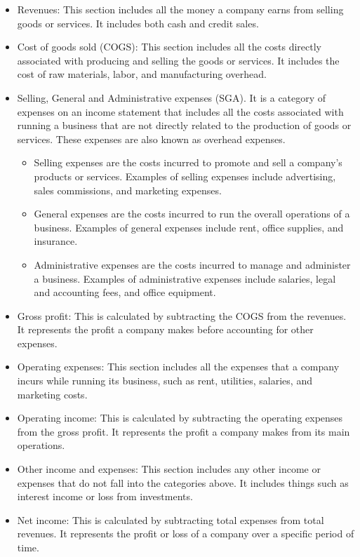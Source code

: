 \documentclass{article}
\begin{document}
\begin{itemize}
    \item Revenues: This section includes all the money a company earns from selling goods or services. It includes both cash and credit sales.

    \item Cost of goods sold (COGS): This section includes all the costs directly associated with producing and selling the goods or services. It includes the cost of raw materials, labor, and manufacturing overhead.

	\item Selling, General and Administrative expenses (SGA). It is a category of expenses on an income statement that includes all the costs associated with running a business that are not directly related to the production of goods or services. These expenses are also known as overhead expenses.
	\begin{itemize}
		\item Selling expenses are the costs incurred to promote and sell a company's products or services. Examples of selling expenses include advertising, sales commissions, and marketing expenses.
		\item General expenses are the costs incurred to run the overall operations of a business. Examples of general expenses include rent, office supplies, and insurance.
		\item Administrative expenses are the costs incurred to manage and administer a business. Examples of administrative expenses include salaries, legal and accounting fees, and office equipment.
	\end{itemize}

    \item Gross profit: This is calculated by subtracting the COGS from the revenues. It represents the profit a company makes before accounting for other expenses.

    \item Operating expenses: This section includes all the expenses that a company incurs while running its business, such as rent, utilities, salaries, and marketing costs.

    \item Operating income: This is calculated by subtracting the operating expenses from the gross profit. It represents the profit a company makes from its main operations.

    \item Other income and expenses: This section includes any other income or expenses that do not fall into the categories above. It includes things such as interest income or loss from investments.

    \item Net income: This is calculated by subtracting total expenses from total revenues. It represents the profit or loss of a company over a specific period of time.

\end{itemize}
\end{document}
